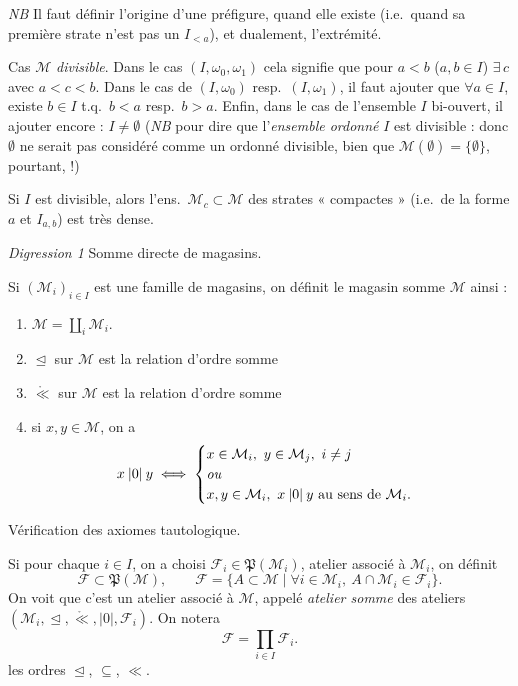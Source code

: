 \documentclass[11pt,a4paper]{article}
\begin{document}
\textit{NB} Il faut définir l'origine d'une préfigure, quand elle existe (i.e.\ quand sa première strate \struck{\ill{}} n'est pas un $I_{<a}$), et dualement, l'extrémité.


Cas $\mathcal{M}$ \textit{divisible}. Dans le cas $(I,\omega_0,\omega_1)$ cela signifie que pour  $a<b$ ($a,b\in I$) $\exists\, c$ avec $a<c<b$. Dans le cas de $(I,\omega_0)$ resp.\ $(I,\omega_1)$, il faut ajouter que $\forall a\in I$, existe $b\in I$ t.q.\ $b<a$ resp.\ $b>a$. Enfin, dans le cas de l'ensemble $I$ bi-ouvert, il  \struck{\ill{}} ajouter encore : $I\neq\emptyset$ (\textit{NB} pour dire que l'\textit{ensemble ordonné} $I$ est divisible : donc $\emptyset$ ne serait pas considéré comme un ordonné divisible, bien que $\mathcal{M}(\emptyset)=\{\emptyset\}$,  pourtant,  !)

Si $I$ est divisible, alors l'ens.\ $\mathcal{M}_c\subset\mathcal{M}$ des strates « compactes » (i.e.\ de la forme $a$ et $I_{a,b}$) est très dense.

\textit{Digression 1} \quad Somme directe de magasins.

Si $(\mathcal{M}_i)_{i\in I}$ est une famille de magasins, on définit le magasin somme $\mathcal{M}$ ainsi :
\begin{enumerate}
  \item[a)] $\mathcal{M}=\coprod_i\mathcal{M}_i$.
  \item[b)] $\trianglelefteq$ sur $\mathcal{M}$ est la relation d'ordre somme
  \item[c)] $\mathring{\ll}$ sur $\mathcal{M}$ est la relation d'ordre somme \ill{}
  \item[d)] si $x,y\in\mathcal{M}$, on a
  \[
    x\mathbin{|0|}y \iff \begin{cases}
      x\in\mathcal{M}_i,\ y\in\mathcal{M}_j,\ i\neq j\\
      \text{\textit{ou}}\\
      x,y\in\mathcal{M}_i,\ x\mathbin{|0|}y \text{ au sens de } \mathcal{M}_i .
    \end{cases}
  \]
\end{enumerate}
Vérification des axiomes tautologique.

Si pour chaque $i\in I$, on a choisi $\mathcal{F}_i\in\mathfrak{P}(\mathcal{M}_i)$, atelier associé à $\mathcal{M}_i$, on définit
\[
  \mathcal{F}\subset\mathfrak{P}(\mathcal{M}),\qquad \mathcal{F}=\{A\subset\mathcal{M}\mid \forall i\in\mathcal{M}_i,\ A\cap\mathcal{M}_i\in\mathcal{F}_i\}.
\]
On voit que c'est un atelier associé à $\mathcal{M}$, appelé \textit{atelier somme} des ateliers $(\mathcal{M}_i,\trianglelefteq,\mathring{\ll},|0|,\mathcal{F}_i)$. On notera
\[
  \mathcal{F}=\prod_{i\in I}\mathcal{F}_i .
\]
 \ill{} \ill{} les ordres $\trianglelefteq$, $\subseteq$, $\ll$.
\end{document}
